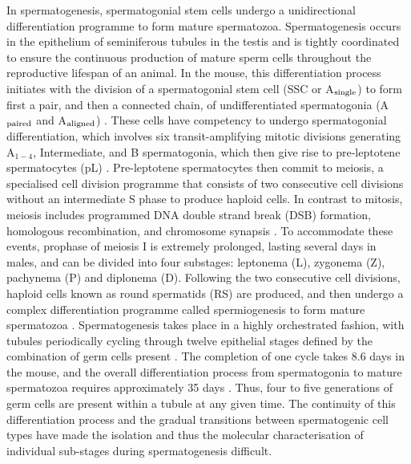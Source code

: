 In spermatogenesis, spermatogonial stem cells undergo a unidirectional differentiation programme to form mature spermatozoa. Spermatogenesis occurs in the epithelium of seminiferous tubules in the testis and is tightly coordinated to ensure the continuous production of mature sperm cells throughout the reproductive lifespan of an animal. In the mouse, this differentiation process initiates with the division of a spermatogonial stem cell (SSC or A$_{\textnormal{single}}$) to form first a pair, and then a connected chain, of undifferentiated spermatogonia (A$_{\textnormal{paired}}$ and A$_{\textnormal{aligned}}$) \citep{Oakberg1971, DeRooij1973}. These cells have competency to undergo spermatogonial differentiation, which involves six transit-amplifying mitotic divisions generating A$_{1-4}$, Intermediate, and B spermatogonia, which then give rise to pre-leptotene spermatocytes (pL) \citep{DeRooij2000}. Pre-leptotene spermatocytes then commit to meiosis, a specialised cell division programme that consists of two consecutive cell divisions without an intermediate S phase to produce haploid cells. In contrast to mitosis, meiosis includes programmed DNA double strand break (DSB) formation, homologous recombination, and chromosome synapsis \citep{Marston2004}. To accommodate these events, prophase of meiosis I is extremely prolonged, lasting several days in males, and can be divided into four substages: leptonema (L), zygonema (Z), pachynema (P) and diplonema (D). Following the two consecutive cell divisions, haploid cells known as round spermatids (RS) are produced, and then undergo a complex differentiation programme called spermiogenesis to form mature spermatozoa \citep{Oakberg1956}.  Spermatogenesis takes place in a highly orchestrated fashion, with tubules periodically cycling through twelve epithelial stages defined by the combination of germ cells present \citep{Oakberg1956}. The completion of one cycle takes 8.6 days in the mouse, and the overall differentiation process from spermatogonia to mature spermatozoa requires approximately 35 days \citep{Oakberg1956a}. Thus, four to five generations of germ cells are present within a tubule at any given time. The continuity of this differentiation process and the gradual transitions between spermatogenic cell types have made the isolation and thus the molecular characterisation of individual sub-stages during spermatogenesis difficult.\\

